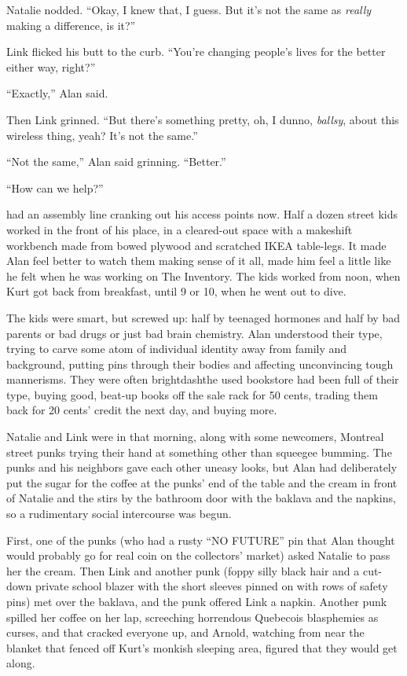 Natalie nodded.  ``Okay, I knew that, I guess.  But it's not the same
as \textit{really} making a difference, is it?''

Link flicked his butt to the curb.  ``You're changing people's lives
for the better either way, right?''

``Exactly,'' Alan said.

Then Link grinned.  ``But there's something pretty, oh, I dunno,
\textit{ballsy}, about this wireless thing, yeah?  It's not the
same.''

``Not the same,'' Alan said grinning.  ``Better.''

``How can we help?''

 had an assembly line cranking out his access points now.  Half a
dozen street kids worked in the front of his place, in a cleared-out
space with a makeshift workbench made from bowed plywood and scratched
IKEA table-legs.  It made Alan feel better to watch them making sense
of it all, made him feel a little like he felt when he was working on
The Inventory.  The kids worked from noon, when Kurt got back from
breakfast, until 9 or 10, when he went out to dive.

The kids were smart, but screwed up:  half by teenaged hormones and
half by bad parents or bad drugs or just bad brain chemistry.  Alan
understood their type, trying to carve some atom of individual
identity away from family and background, putting pins through their
bodies and affecting unconvincing tough mannerisms.  They were often
brightdash{}the used bookstore had been full of their type, buying good,
beat-up books off the sale rack for 50 cents, trading them back for 20
cents' credit the next day, and buying more.

Natalie and Link were in that morning, along with some newcomers,
Montreal street punks trying their hand at something other than
squeegee bumming.  The punks and his neighbors gave each other uneasy
looks, but Alan had deliberately put the sugar for the coffee at the
punks' end of the table and the cream in front of Natalie and the
stirs by the bathroom door with the baklava and the napkins, so a
rudimentary social intercourse was begun.

First, one of the punks (who had a rusty ``NO FUTURE'' pin that Alan
thought would probably go for real coin on the collectors' market)
asked Natalie to pass her the cream.  Then Link and another punk
(foppy silly black hair and a cut-down private school blazer with the
short sleeves pinned on with rows of safety pins) met over the
baklava, and the punk offered Link a napkin.  Another punk spilled her
coffee on her lap, screeching horrendous Quebecois blasphemies as
curses, and that cracked everyone up, and Arnold, watching from near
the blanket that fenced off Kurt's monkish sleeping area, figured that
they would get along.

